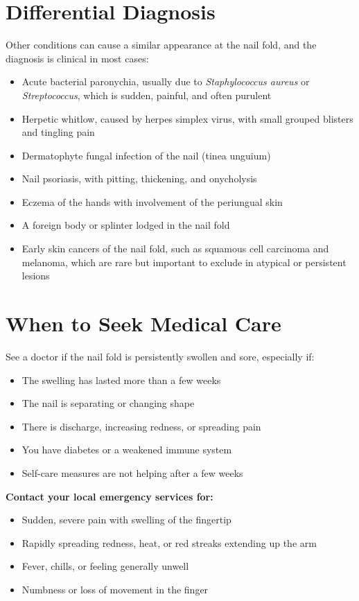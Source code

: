 \section*{Differential Diagnosis}
Other conditions can cause a similar appearance at the nail fold, and the diagnosis is clinical in most cases:
\begin{itemize}
    \item Acute bacterial paronychia, usually due to \textit{Staphylococcus aureus} or \textit{Streptococcus}, which is sudden, painful, and often purulent
    \item Herpetic whitlow, caused by herpes simplex virus, with small grouped blisters and tingling pain
    \item Dermatophyte fungal infection of the nail (tinea unguium)
    \item Nail psoriasis, with pitting, thickening, and onycholysis
    \item Eczema of the hands with involvement of the periungual skin
    \item A foreign body or splinter lodged in the nail fold
    \item Early skin cancers of the nail fold, such as squamous cell carcinoma and melanoma, which are rare but important to exclude in atypical or persistent lesions
\end{itemize}

\section*{When to Seek Medical Care}
See a doctor if the nail fold is persistently swollen and sore, especially if:
\begin{itemize}
    \item The swelling has lasted more than a few weeks
    \item The nail is separating or changing shape
    \item There is discharge, increasing redness, or spreading pain
    \item You have diabetes or a weakened immune system
    \item Self-care measures are not helping after a few weeks
\end{itemize}
\textbf{Contact your local emergency services for:}
\begin{itemize}
    \item Sudden, severe pain with swelling of the fingertip
    \item Rapidly spreading redness, heat, or red streaks extending up the arm
    \item Fever, chills, or feeling generally unwell
    \item Numbness or loss of movement in the finger
\end{itemize}

